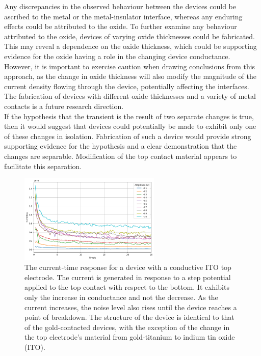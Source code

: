 \noindent Any discrepancies in the observed behaviour between the devices could be ascribed to the metal or the metal-insulator interface, whereas any enduring effects could be attributed to the oxide. To further examine any behaviour attributed to the oxide, devices of varying oxide thicknesses could be fabricated. This may reveal a dependence on the oxide thickness, which could be supporting evidence for the oxide having a role in the changing device conductance. \\

\noindent However, it is important to exercise caution when drawing conclusions from this approach, as the change in oxide thickness will also modify the magnitude of the current density flowing through the device, potentially affecting the interfaces. The fabrication of devices with different oxide thicknesses and a variety of metal contacts is a future research direction. \\

\noindent If the hypothesis that the transient is the result of two separate changes is true, then it would suggest that devices could potentially be made to exhibit only one of these changes in isolation. Fabrication of such a device would provide strong supporting evidence for the hypothesis and a clear demonstration that the changes are separable. Modification of the top contact material appears to facilitate this separation.\\

\begin{figure}[htbp!] 
\centering    
\includegraphics[width=0.6\textwidth]{Chapter5/Figs/b.png}
\caption[The current-time response for a device with a conductive ITO top electrode.]{The current-time response for a device with a conductive ITO top electrode. The current is generated in response to a step potential applied to the top contact with respect to the bottom. It exhibits only the increase in conductance and not the decrease. As the current increases, the noise level also rises until the device reaches a point of breakdown. The structure of the device is identical to that of the gold-contacted devices, with the exception of the change in the top electrode's material from gold-titanium to indium tin oxide (ITO).}
\label{fig:5b}
\end{figure}

